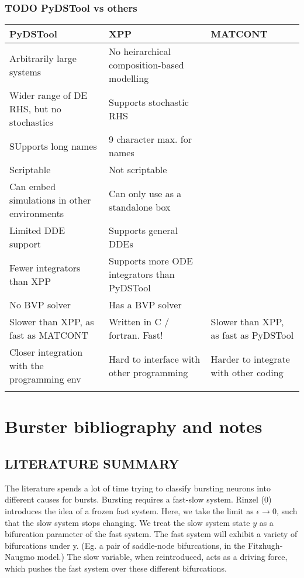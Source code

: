 \documentclass[11pt]{article}
\begin{document}
\subsubsection{{\bfseries\sffamily TODO} PyDSTool vs others}
\label{sec:org934bf57}

\begin{center}
\begin{tabular}{lll}
PyDSTool & XPP & MATCONT\\
\hline
Arbitrarily large systems & No heirarchical composition-based modelling & \\
Wider range of DE RHS, but no stochastics & Supports stochastic RHS & \\
SUpports long names & 9 character max. for names & \\
Scriptable & Not scriptable & \\
Can embed simulations in other environments & Can only use as a standalone box & \\
Limited DDE support & Supports general DDEs & \\
Fewer integrators than XPP & Supports more ODE integrators than PyDSTool & \\
No BVP solver & Has a BVP solver & \\
Slower than XPP, as fast as MATCONT & Written in C / fortran. Fast! & Slower than XPP, as fast as PyDSTool\\
Closer integration with the programming env & Hard to interface with other programming & Harder to integrate with other coding\\
 &  & \\
\end{tabular}
\end{center}
\newpage
\section{Burster bibliography and notes}
\label{sec:org55c1532}
\subsection{LITERATURE SUMMARY}
\label{sec:orgaa90283}
The literature spends a lot of time trying to classify bursting neurons into different causes for bursts.
Bursting requires a fast-slow system.
Rinzel (0) introduces the idea of a frozen fast system.
Here, we take the limit as \(\epsilon \to 0\), such that the slow system stops changing.
We treat the slow system state \(y\) as a bifurcation parameter of the fast system.
The fast system will exhibit a variety of bifurcations under y.
(Eg. a pair of saddle-node bifurcations, in the Fitzhugh-Naugmo model.)
The slow variable, when reintroduced, acts as a driving force, which pushes the fast system over these different bifurcations.
\end{document}
